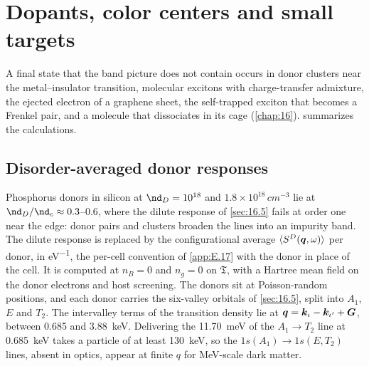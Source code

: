 \section{Dopants, color centers and small targets}\label{app:E.21}

A final state that the band picture does not contain occurs in donor clusters near the metal--insulator transition, molecular excitons with charge-transfer admixture, the ejected electron of a graphene sheet, the self-trapped exciton that becomes a Frenkel pair, and a molecule that dissociates in its cage (\cref{chap:16}).  summarizes the calculations.

\subsection{Disorder-averaged donor responses}

Phosphorus donors in silicon at $\nd_D = 10^{18}$ and $1.8\times10^{18}\,\si{cm^{-3}}$ lie at $\nd_D/\nd_c \approx 0.3$--0.6, where the dilute response of \cref{sec:16.5} fails at order one near the edge: donor pairs and clusters broaden the lines into an impurity band. The dilute response is replaced by the configurational average $\langle S^D(\bm{q},\omega)\rangle$ per donor, in \si{eV^{-1}}, the per-cell convention of \cref{app:E.17} with the donor in place of the cell. It is computed at $n_B = 0$ and $n_g = 0$ on $\mathfrak{T}$, with a Hartree mean field on the donor electrons and host screening. The donors sit at Poisson-random positions, and each donor carries the six-valley orbitals of \cref{sec:16.5}, split into $A_1$, $E$ and $T_2$. The intervalley terms of the transition density lie at $\bm{q} = \bm{k}_\iota - \bm{k}_{\iota'} + \bm{G}$, between 0.685 and \SI{3.88}{keV}. Delivering the \SI{11.70}{meV} of the $A_1 \to T_2$ line at \SI{0.685}{keV} takes a particle of at least \SI{130}{keV}, so the $1s(A_1) \to 1s(E,T_2)$ lines, absent in optics, appear at finite $q$ for MeV-scale dark matter.

